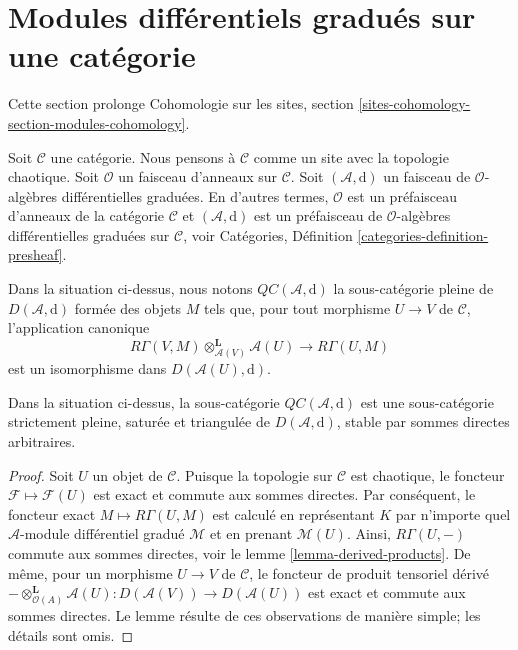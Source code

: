\section{Modules différentiels gradués sur une catégorie}
\label{section-modules-cohomology}

\noindent
Cette section prolonge Cohomologie sur les sites, section \ref{sites-cohomology-section-modules-cohomology}.

\medskip\noindent
Soit $\mathcal{C}$ une catégorie.
Nous pensons à $\mathcal{C}$ comme un site avec la topologie chaotique.
Soit $\mathcal{O}$ un faisceau d'anneaux sur $\mathcal{C}$.
Soit $(\mathcal{A}, \text{d})$ un faisceau de $\mathcal{O}$-algèbres différentielles graduées.
En d'autres termes, $\mathcal{O}$ est un préfaisceau d'anneaux de la catégorie $\mathcal{C}$ et $(\mathcal{A}, \text{d})$ est un préfaisceau de $\mathcal{O}$-algèbres différentielles graduées sur $\mathcal{C}$, voir Catégories, Définition \ref{categories-definition-presheaf}.

\begin{definition}
\label{definition-cartesian}
Dans la situation ci-dessus, nous notons {\it $\mathit{QC}(\mathcal{A}, \text{d})$} la sous-catégorie pleine de $D(\mathcal{A}, \text{d})$ formée des objets $M$ tels que, pour tout morphisme $U \to V$ de $\mathcal{C}$, l'application canonique
$$
R\Gamma(V, M) \otimes_{\mathcal{A}(V)}^\mathbf{L} \mathcal{A}(U)
\longrightarrow
R\Gamma(U, M)
$$
est un isomorphisme dans $D(\mathcal{A}(U), \text{d})$.
\end{definition}

\begin{lemma}
\label{lemma-cartesian-good-sub}
Dans la situation ci-dessus, la sous-catégorie $\mathit{QC}(\mathcal{A}, \text{d})$ est une sous-catégorie strictement pleine, saturée et triangulée de $D(\mathcal{A}, \text{d})$, stable par sommes directes arbitraires.
\end{lemma}

\begin{proof}
Soit $U$ un objet de $\mathcal{C}$.
Puisque la topologie sur $\mathcal{C}$ est chaotique, le foncteur $\mathcal{F} \mapsto \mathcal{F}(U)$ est exact et commute aux sommes directes.
Par conséquent, le foncteur exact $M \mapsto R\Gamma(U, M)$ est calculé en représentant $K$ par n'importe quel $\mathcal{A}$-module différentiel gradué $\mathcal{M}$ et en prenant $\mathcal{M}(U)$.
Ainsi, $R\Gamma(U, -)$ commute aux sommes directes, voir le lemme \ref{lemma-derived-products}.
De même, pour un morphisme $U \to V$ de $\mathcal{C}$, le foncteur de produit tensoriel dérivé $- \otimes_{\mathcal{O}(A)}^\mathbf{L} \mathcal{A}(U) : D(\mathcal{A}(V)) \to D(\mathcal{A}(U))$ est exact et commute aux sommes directes.
Le lemme résulte de ces observations de manière simple; les détails sont omis.
\end{proof}

